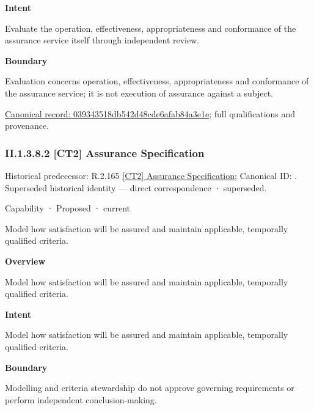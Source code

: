 \textbf{Intent}



Evaluate the operation, effectiveness, appropriateness and conformance of the assurance service itself through independent review.



\textbf{Boundary}



Evaluation concerns operation, effectiveness, appropriateness and conformance of the assurance service; it is not execution of assurance against a subject.


{\footnotesize \href{../../../../continuum/strategy/capability/039343518db542d48cde6afab84a3e1e.md}{Canonical record: 039343518db542d48cde6afab84a3e1e}; full qualifications and provenance.}\par
\subsubsection*{II.1.3.8.2 [CT2] Assurance Specification}
\label{navigation:II.1.3.8.2}

{\small Historical predecessor: R.2.165 \hyperref[element:8006ee0dd95f4d7fb1f408fa09b6ce19]{[CT2] Assurance Specification}; Canonical ID: \texttt{}. Superseded historical identity — direct correspondence · superseded.}\par
\label{element:b81775d89d774cf8ba61731d13c67a54}
{\small Capability · Proposed · current}\par

Model how satisfaction will be assured and maintain applicable, temporally qualified criteria.



\textbf{Overview}



Model how satisfaction will be assured and maintain applicable, temporally qualified criteria.



\textbf{Intent}



Model how satisfaction will be assured and maintain applicable, temporally qualified criteria.



\textbf{Boundary}



Modelling and criteria stewardship do not approve governing requirements or perform independent conclusion-making.


